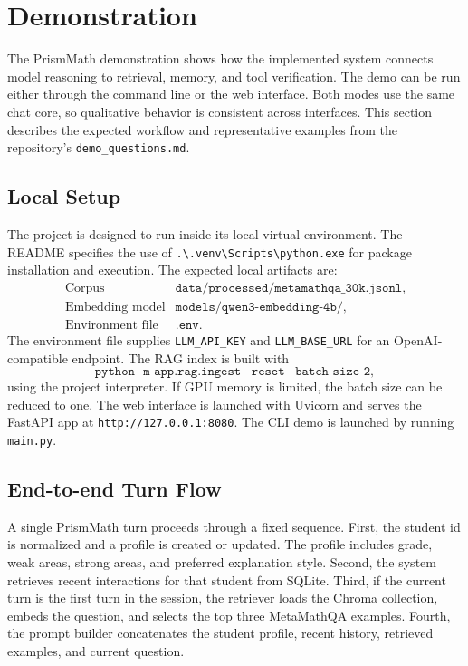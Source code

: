 \section{Demonstration}

The PrismMath demonstration shows how the implemented system connects model reasoning to retrieval, memory, and tool verification. The demo can be run either through the command line or the web interface. Both modes use the same chat core, so qualitative behavior is consistent across interfaces. This section describes the expected workflow and representative examples from the repository's \texttt{demo\_questions.md}.

\subsection{Local Setup}

The project is designed to run inside its local virtual environment. The README specifies the use of \texttt{.\textbackslash.venv\textbackslash Scripts\textbackslash python.exe} for package installation and execution. The expected local artifacts are:
\[
\begin{array}{ll}
\text{Corpus} & \texttt{data/processed/metamathqa\_30k.jsonl},\\
\text{Embedding model} & \texttt{models/qwen3-embedding-4b/},\\
\text{Environment file} & \texttt{.env}.
\end{array}
\]
The environment file supplies \texttt{LLM\_API\_KEY} and \texttt{LLM\_BASE\_URL} for an OpenAI-compatible endpoint. The RAG index is built with
\[
\texttt{python -m app.rag.ingest --reset --batch-size 2},
\]
using the project interpreter. If GPU memory is limited, the batch size can be reduced to one. The web interface is launched with Uvicorn and serves the FastAPI app at \texttt{http://127.0.0.1:8080}. The CLI demo is launched by running \texttt{main.py}.

\subsection{End-to-end Turn Flow}

A single PrismMath turn proceeds through a fixed sequence. First, the student id is normalized and a profile is created or updated. The profile includes grade, weak areas, strong areas, and preferred explanation style. Second, the system retrieves recent interactions for that student from SQLite. Third, if the current turn is the first turn in the session, the retriever loads the Chroma collection, embeds the question, and selects the top three MetaMathQA examples. Fourth, the prompt builder concatenates the student profile, recent history, retrieved examples, and current question.

